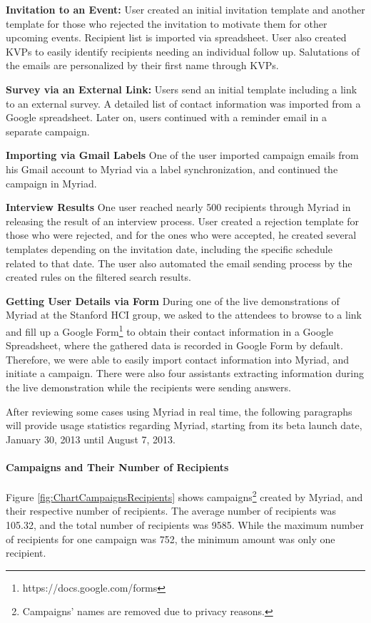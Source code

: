 \begin{compactitem}
	\item \textbf{Invitation to an Event:} User created an initial invitation template and another template for those who rejected the invitation to motivate them for other upcoming events. Recipient list is imported via spreadsheet. User also created \ac{KVP}s to easily identify recipients needing an individual follow up. Salutations of the emails are personalized by their first name through \ac{KVP}s.
	\item \textbf{Survey via an External Link:} Users send an initial template including a link to an external survey. A detailed list of contact information was imported from a Google spreadsheet. Later on, users continued with a reminder email in a separate campaign.
	\item \textbf{Importing via Gmail Labels} One of the user imported campaign emails from his Gmail account to Myriad via a label synchronization, and continued the campaign in Myriad.
	\item \textbf{Interview Results} One user reached nearly 500 recipients through Myriad in releasing the result of an interview process. User created a rejection template for those who were rejected, and for the ones who were accepted, he created several templates depending on the invitation date, including the specific schedule related to that date. The user also automated the email sending process by the created rules on the filtered search results.
	\item \textbf{Getting User Details via Form} During one of the live demonstrations of Myriad at the Stanford \ac{HCI} group, we asked to the attendees to browse to a link and fill up a Google Form\footnote{https://docs.google.com/forms} to obtain their contact information in a Google Spreadsheet, where the gathered data is recorded in Google Form by default. Therefore, we were able to easily import contact information into Myriad, and initiate a campaign. There were also four assistants extracting information during the live demonstration while the recipients were sending answers.
\end{compactitem}
\vspace{1cm}

After reviewing some cases using Myriad in real time, the following paragraphs will provide usage statistics regarding Myriad, starting from its beta launch date, January 30, 2013 until August 7, 2013.

\paragraph{Campaigns and Their Number of Recipients} Figure \ref{fig:ChartCampaignsRecipients} shows campaigns\footnote{Campaigns' names are removed due to privacy reasons.} created by Myriad, and their respective number of recipients. The average number of recipients was 105.32, and the total number of recipients was 9585. While the maximum number of recipients for one campaign was 752, the minimum amount was only one recipient.

